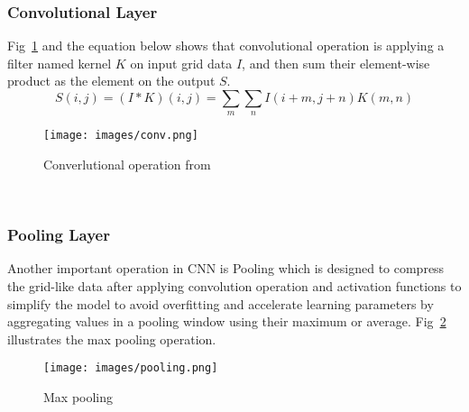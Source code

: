 \documentclass[a4paper, 11pt]{report}
\begin{document}
 \subsubsection{Convolutional Layer}
Fig~\ref{fig:conv} and the equation below shows that convolutional operation is applying a filter named kernel $K$ on input grid data $I$, and then sum their element-wise product as the element on the output $S$.
$$S(i, j)=(I * K)(i, j)=\sum_{m} \sum_{n} I(i+m, j+n) K(m, n)$$
 \begin{figure}[h]
 	\caption{Converlutional operation from \protect{}}
 	\centering
 	\texttt{[image: images/conv.png]}
 	\label{fig:conv}
 \end{figure}\\
\subsubsection{Pooling Layer}
Another important operation in CNN is Pooling which is designed to compress the grid-like data after applying convolution operation and activation functions to simplify the model to avoid overfitting and accelerate learning parameters by aggregating values in a pooling window using their maximum or average. Fig~\ref{fig:pool} illustrates the max pooling operation.
 \begin{figure}[h]
 	\caption{Max pooling}
 	\centering
 	\texttt{[image: images/pooling.png]}
 	\label{fig:pool}
 \end{figure}\\
\end{document}
